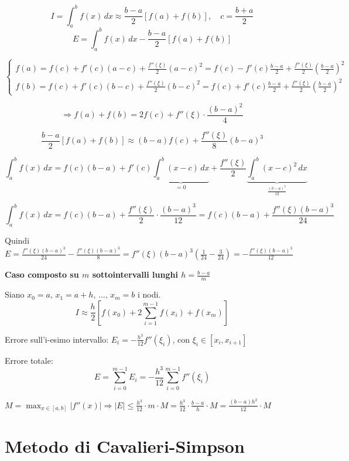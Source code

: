 \documentclass[12pt,a4paper]{article}
\begin{document}
\[
I = \int_a^b f(x)\,dx \approx \frac{b - a}{2} [f(a) + f(b)],\quad c= \frac{b+a}{2}
\]
\[
E = \int_a^b f(x)\,dx - \frac{b - a}{2} [f(a) + f(b)]
\]

\[\begin{cases}
f(a) = f(c) + f'(c)(a-c) + \frac{f''(\xi)}{2}(a-c)^2 = f(c) - f'(c)\frac{b - a}{2} + \frac{f''(\xi)}{2} \left(\frac{b - a}{2}\right)^2\\
f(b) = f(c)+f'(c)(b-c)+\frac{f''(\xi)}{2}(b-c)^2=f(c) + f'(c)\frac{b - a}{2} + \frac{f''(\xi)}{2} \left(\frac{b - a}{2}\right)^2\end{cases}
\]

\[
\Rightarrow f(a) + f(b) = 2f(c) + f''(\xi) \cdot \frac{(b - a)^2}{4}
\]

\[
\frac{b - a}{2}[f(a) + f(b)] \approx (b - a)f(c) + \frac{f''(\xi)}{8}(b - a)^3
\]

\[
\int_a^b f(x)\,dx = f(c)(b - a) + f'(c)\underbrace{\int_a^b (x - c)\,dx}_{=0} + \frac{f''(\xi)}{2}\underbrace{\int_a^b (x - c)^2\,dx}_{\frac{(b-a)^3}{12}}
\]

\[\int_a^b f(x)\,dx = f(c)(b - a) + \frac{f''(\xi)}{2} \cdot \frac{(b-a)^3}{12} = f(c)(b - a) + \frac{f''(\xi)(b-a)^3}{24}
\]

Quindi
$E = \frac{f''(\xi)(b-a)^3}{24} - \frac{f''(\xi)(b-a)^3}{8} = f''(\xi)(b-a)^3\left(\frac{1}{24} - \frac{3}{24}\right) = -\frac{f''(\xi)(b-a)^3}{12}$

\vspace{1em}

\textbf{Caso composto su \(m\) sottointervalli lunghi \(h = \frac{b - a}{m}\)}

Siano \(x_0 = a,\, x_1 = a + h,\, \dots,\, x_m = b\) i nodi.
\[I \approx \frac{h}{2} \left[f(x_0) + 2\sum_{i=1}^{m-1} f(x_i) + f(x_m)\right]\]

Errore sull'i-esimo intervallo: \(E_i = -\frac{h^3}{12} f''(\xi_i)\), con \(\xi_i \in [x_i, x_{i+1}]\)

Errore totale:
\[
E = \sum_{i=0}^{m-1} E_i = -\frac{h^3}{12} \sum_{i=0}^{m-1} f''(\xi_i)
\]

$M = \max_{x \in [a,b]} |f''(x)| \Rightarrow
|E| \leq \frac{h^3}{12} \cdot m \cdot M = \frac{h^3}{12} \cdot \frac{b-a}{h} \cdot M = \frac{(b-a)h^2}{12} \cdot M$


\section*{Metodo di Cavalieri-Simpson}
\end{document}
